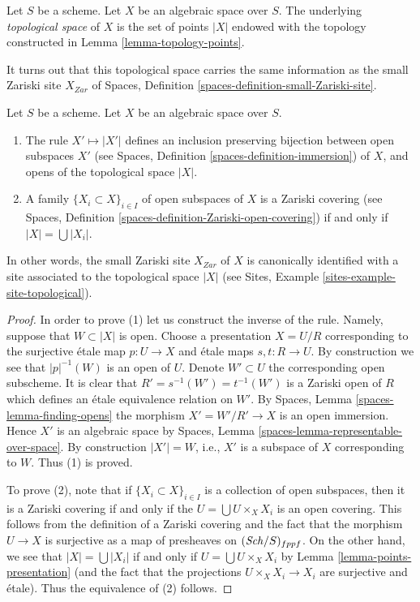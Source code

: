 \begin{definition}
\label{definition-topological-space}
Let $S$ be a scheme. Let $X$ be an algebraic space over $S$.
The underlying {\it topological space} of $X$ is the set of points
$|X|$ endowed with the topology constructed in
Lemma \ref{lemma-topology-points}.
\end{definition}

\noindent
It turns out that this topological space carries the same information
as the small Zariski site $X_{Zar}$ of
Spaces, Definition \ref{spaces-definition-small-Zariski-site}.

\begin{lemma}
\label{lemma-open-subspaces}
Let $S$ be a scheme.
Let $X$ be an algebraic space over $S$.
\begin{enumerate}
\item The rule $X' \mapsto |X'|$ defines an inclusion preserving
bijection between open subspaces $X'$ (see
Spaces, Definition \ref{spaces-definition-immersion})
of $X$, and opens of the topological space $|X|$.
\item A family $\{X_i \subset X\}_{i \in I}$ of open subspaces of $X$
is a Zariski covering (see
Spaces, Definition \ref{spaces-definition-Zariski-open-covering})
if and only if $|X| = \bigcup |X_i|$.
\end{enumerate}
In other words, the small Zariski site $X_{Zar}$ of $X$ is canonically
identified with a site associated to the topological space $|X|$ (see
Sites, Example \ref{sites-example-site-topological}).
\end{lemma}

\begin{proof}
In order to prove (1) let us construct the inverse of the rule.
Namely, suppose that $W \subset |X|$ is open. Choose a presentation
$X = U/R$ corresponding to the surjective \'etale map
$p : U \to X$ and \'etale maps $s, t : R \to U$.
By construction we see that $|p|^{-1}(W)$ is an
open of $U$. Denote $W' \subset U$ the corresponding open subscheme.
It is clear that $R' = s^{-1}(W') = t^{-1}(W')$ is a Zariski open
of $R$ which defines an \'etale equivalence relation on $W'$.
By Spaces, Lemma \ref{spaces-lemma-finding-opens} the morphism
$X' = W'/R' \to X$ is an open immersion. Hence $X'$ is an algebraic space
by Spaces, Lemma \ref{spaces-lemma-representable-over-space}.
By construction $|X'| = W$, i.e., $X'$ is a subspace of $X$
corresponding to $W$. Thus (1) is proved.

\medskip\noindent
To prove (2), note that if $\{X_i \subset X\}_{i \in I}$ is a collection
of open subspaces, then it is a Zariski covering if and only if the
$U = \bigcup U \times_X X_i$ is an open covering. This follows from
the definition of a Zariski covering and the fact that the morphism
$U \to X$ is surjective as a map of presheaves on $(\mathit{Sch}/S)_{fppf}$.
On the other hand, we see that $|X| = \bigcup |X_i|$ if and only if
$U = \bigcup U \times_X X_i$ by Lemma \ref{lemma-points-presentation}
(and the fact that the projections $U \times_X X_i \to X_i$ are surjective
and \'etale). Thus the equivalence of (2) follows.
\end{proof}


